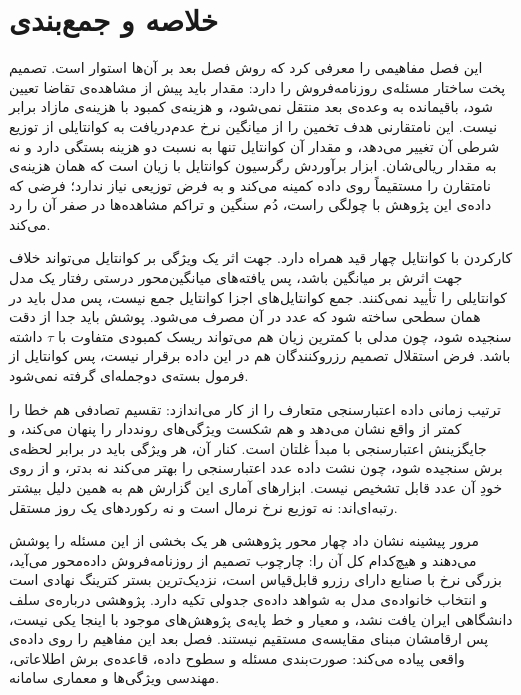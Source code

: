 \section{خلاصه و جمع‌بندی}
\label{sec:2-8}

این فصل مفاهیمی را معرفی کرد که روش فصل بعد بر آن‌ها استوار است. تصمیم پخت ساختار
مسئله‌ی روزنامه‌فروش را دارد: مقدار باید پیش از مشاهده‌ی تقاضا تعیین شود، باقیمانده به
وعده‌ی بعد منتقل نمی‌شود، و هزینه‌ی کمبود با هزینه‌ی مازاد برابر نیست. این نامتقارنی هدف
تخمین را از میانگین نرخ عدم‌دریافت به کوانتایلی از توزیع شرطی آن تغییر می‌دهد، و مقدار آن
کوانتایل تنها به نسبت دو هزینه بستگی دارد و نه به مقدار ریالی‌شان. ابزار برآوردش رگرسیون
کوانتایل با زیان  است که همان هزینه‌ی نامتقارن را مستقیماً روی داده کمینه می‌کند و
به فرض توزیعی نیاز ندارد؛ فرضی که داده‌ی این پژوهش با چولگی راست، دُم سنگین و تراکم
مشاهده‌ها در صفر آن را رد می‌کند.

کارکردن با کوانتایل چهار قید همراه دارد. جهت اثر یک ویژگی بر کوانتایل می‌تواند خلاف
جهت اثرش بر میانگین باشد، پس یافته‌های میانگین‌محور درستی رفتار یک مدل کوانتایلی را
تأیید نمی‌کنند. جمع کوانتایل‌های اجزا کوانتایل جمع نیست، پس مدل باید در همان سطحی ساخته
شود که عدد در آن مصرف می‌شود. پوشش باید جدا از دقت سنجیده شود، چون مدلی با کمترین زیان هم
می‌تواند ریسک کمبودی متفاوت با $\tau$ داشته باشد. فرض استقلال تصمیم رزروکنندگان هم در این
داده برقرار نیست، پس کوانتایل از فرمول بسته‌ی دوجمله‌ای گرفته نمی‌شود.

ترتیب زمانی داده اعتبارسنجی متعارف را از کار می‌اندازد: تقسیم تصادفی هم خطا را کمتر از
واقع نشان می‌دهد و هم شکست ویژگی‌های رونددار را پنهان می‌کند، و جایگزینش اعتبارسنجی با
مبدأ غلتان است. کنار آن، هر ویژگی باید در برابر لحظه‌ی برش سنجیده شود، چون نشت داده
عدد اعتبارسنجی را بهتر می‌کند نه بدتر، و از روی خودِ آن عدد قابل تشخیص نیست. ابزارهای
آماری این گزارش هم به همین دلیل بیشتر رتبه‌ای‌اند: نه توزیع نرخ نرمال است و نه رکوردهای
یک روز مستقل.

مرور پیشینه نشان داد چهار محور پژوهشی هر یک بخشی از این مسئله را پوشش می‌دهند و
هیچ‌کدام کل آن را: چارچوب تصمیم از روزنامه‌فروش داده‌محور می‌آید، بزرگی نرخ با صنایع
دارای رزرو قابل‌قیاس است، نزدیک‌ترین بستر کترینگ نهادی است و انتخاب خانواده‌ی مدل به
شواهد داده‌ی جدولی تکیه دارد. پژوهشی درباره‌ی سلف دانشگاهی ایران یافت نشد، و معیار و
خط پایه‌ی پژوهش‌های موجود با اینجا یکی نیست، پس ارقامشان مبنای مقایسه‌ی مستقیم نیستند.
فصل بعد این مفاهیم را روی داده‌ی واقعی پیاده می‌کند: صورت‌بندی مسئله و سطوح داده، قاعده‌ی
برش اطلاعاتی، مهندسی ویژگی‌ها و معماری سامانه.
